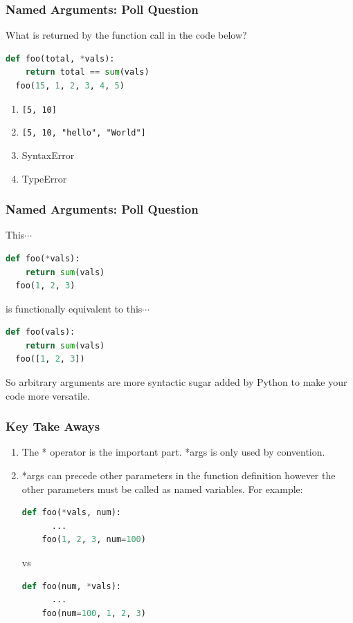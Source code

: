 \documentclass{beamer}
\begin{document}
%
%
\begin{frame}[fragile]
  \frametitle{Named Arguments: Poll Question}
  What is returned by the function call in the code below?
  \begin{lstlisting}[language=Python, autogobble]
  def foo(total, *vals):
    return total == sum(vals)
  foo(15, 1, 2, 3, 4, 5)
  \end{lstlisting}
  \vfill
  \begin{enumerate}[A]
    \item \lstinline|[5, 10]|
    \item \lstinline|[5, 10, "hello", "World"]|
    \item SyntaxError
    \item TypeError
  \end{enumerate}
\end{frame}

%
%
\begin{frame}[fragile]
  \frametitle{Named Arguments: Poll Question}
  This$\cdots$
  \vfill
  \begin{lstlisting}[language=Python, autogobble]
  def foo(*vals):
    return sum(vals)
  foo(1, 2, 3)
  \end{lstlisting}
  \vfill
  is functionally equivalent to this$\cdots$
  \vfill
  \begin{lstlisting}[language=Python, autogobble]
  def foo(vals):
    return sum(vals)
  foo([1, 2, 3])
  \end{lstlisting}
  \vfill
  So arbitrary arguments are more syntactic sugar added by Python to make your code more versatile.
\end{frame}

%
%
\begin{frame}[fragile]
  \frametitle{Key Take Aways}
  \begin{enumerate}[A]
    \item The * operator is the important part. *args is only used by convention.
    \pause
    \item *args can precede other parameters in the function definition however the other parameters must be called as named variables. For example:
    \pause
    \begin{lstlisting}[language=Python, autogobble]
    def foo(*vals, num):
      ...
    foo(1, 2, 3, num=100)
    \end{lstlisting}
    \vfill
    vs
    \vfill
    \begin{lstlisting}[language=Python, autogobble]
    def foo(num, *vals):
      ...
    foo(num=100, 1, 2, 3)
    \end{lstlisting}
  \end{enumerate}
\end{frame}
\end{document}
